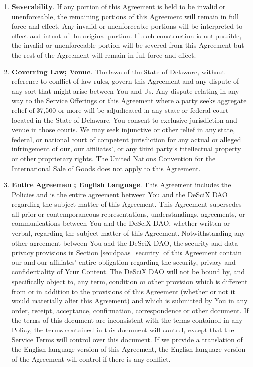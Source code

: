 \documentclass{article}
\begin{document}
\begin{enumerate}
\begin{enumerate}
        \item \textbf{Severability}. If any portion of this Agreement is held to be invalid or unenforceable, the remaining portions of this Agreement will remain in full force and effect. Any invalid or unenforceable portions will be interpreted to effect and intent of the original portion. If such construction is not possible, the invalid or unenforceable portion will be severed from this Agreement but the rest of the Agreement will remain in full force and effect.
        
        \item \textbf{Governing Law; Venue}. The laws of the State of Delaware, without reference to conflict of law rules, govern this Agreement and any dispute of any sort that might arise between You and Us. Any dispute relating in any way to the Service Offerings or this Agreement where a party seeks aggregate relief of \$7,500 or more will be adjudicated in any state or federal court located in the State of Delaware. You consent to exclusive jurisdiction and venue in those courts. We may seek injunctive or other relief in any state, federal, or national court of competent jurisdiction for any actual or alleged infringement of our, our affiliates', or any third party’s intellectual property or other proprietary rights. The United Nations Convention for the International Sale of Goods does not apply to this Agreement.
        
        \item \textbf{Entire Agreement; English Language}. This Agreement includes the Policies and is the entire agreement between You and the DeSciX DAO regarding the subject matter of this Agreement. This Agreement supersedes all prior or contemporaneous representations, understandings, agreements, or communications between You and the DeSciX DAO, whether written or verbal, regarding the subject matter of this Agreement. Notwithstanding any other agreement between You and the DeSciX DAO, the security and data privacy provisions in Section \ref{sec:dpaas_security} of this Agreement contain our and our affiliates’ entire obligation regarding the security, privacy and confidentiality of Your Content. The DeSciX DAO will not be bound by, and specifically object to, any term, condition or other provision which is different from or in addition to the provisions of this Agreement (whether or not it would materially alter this Agreement) and which is submitted by You in any order, receipt, acceptance, confirmation, correspondence or other document. If the terms of this document are inconsistent with the terms contained in any Policy, the terms contained in this document will control, except that the Service Terms will control over this document. If we provide a translation of the English language version of this Agreement, the English language version of the Agreement will control if there is any conflict.
    \end{enumerate}

\end{enumerate}
\end{document}
